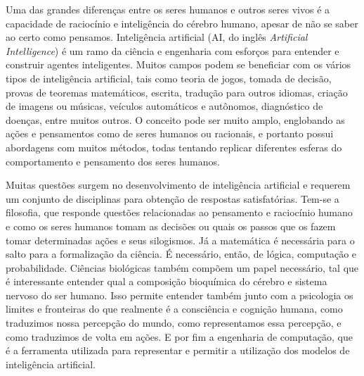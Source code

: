 \documentclass[
	12pt,				%
	oneside,			%
	a4paper,			%
	english,			%
	brazil				%
	]{abntex2}
\begin{document}
	
	Uma das grandes diferenças entre os seres humanos e outros seres vivos é a capacidade de raciocínio e inteligência do cérebro humano, apesar de não se saber ao certo como pensamos. 
	Inteligência artificial (AI, do inglês \textit{Artificial Intelligence}) é um ramo da ciência e engenharia com esforços para entender e construir agentes inteligentes. \cite{russell2016artificial}
	Muitos campos podem se beneficiar com os vários tipos de inteligência artificial, tais como teoria de jogos, tomada de decisão, provas de teoremas matemáticos, escrita, tradução para outros idiomas, criação de imagens ou músicas, veículos automáticos e autônomos, diagnóstico de doenças, entre muitos outros. 
	O conceito pode ser muito amplo, englobando as ações e pensamentos como de seres humanos ou racionais, e portanto possui abordagens com muitos métodos, todas tentando replicar diferentes esferas do comportamento e pensamento dos seres humanos. 
	
	Muitas questões surgem no desenvolvimento de inteligência artificial e requerem um conjunto de disciplinas para obtenção de respostas satisfatórias. Tem-se a filosofia, que responde questões relacionadas ao pensamento e raciocínio humano e como os seres humanos tomam as decisões ou quais os passos que os fazem tomar determinadas ações e seus silogismos. Já a matemática é necessária para o salto para a formalização da ciência. É necessário, então, de lógica, computação e probabilidade. Ciências biológicas também compõem um papel necessário, tal que é interessante entender qual a composição bioquímica do cérebro e sistema nervoso do ser humano. Isso permite entender também junto com a psicologia os limites e fronteiras do que realmente é a consciência e cognição humana, como traduzimos nossa percepção do mundo, como representamos essa percepção,  e como traduzimos de volta em ações. E por fim a engenharia de computação, que é a ferramenta utilizada para representar e permitir a utilização dos modelos de inteligência artificial. 
		
\end{document}
